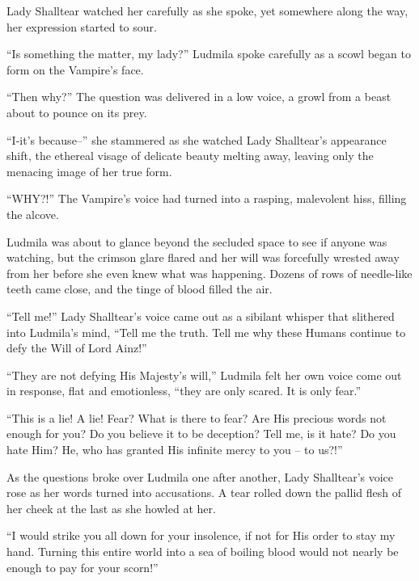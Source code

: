  

Lady Shalltear watched her carefully as she spoke, yet somewhere along the way, her expression started to sour.

 

“Is something the matter, my lady?” Ludmila spoke carefully as a scowl began to form on the Vampire’s face.

 

“Then why?” The question was delivered in a low voice, a growl from a beast about to pounce on its prey.

 

“I-it’s because–” she stammered as she watched Lady Shalltear’s appearance shift, the ethereal visage of delicate beauty melting away, leaving only the menacing image of her true form.

 

“WHY?!” The Vampire’s voice had turned into a rasping, malevolent hiss, filling the alcove.

 

Ludmila was about to glance beyond the secluded space to see if anyone was watching, but the crimson glare flared and her will was forcefully wrested away from her before she even knew what was happening. Dozens of rows of needle-like teeth came close, and the tinge of blood filled the air.

 

“Tell me!” Lady Shalltear’s voice came out as a sibilant whisper that slithered into Ludmila’s mind, “Tell me the truth. Tell me why these Humans continue to defy the Will of Lord Ainz!”

 

“They are not defying His Majesty’s will,” Ludmila felt her own voice come out in response, flat and emotionless, “they are only scared. It is only fear.”

 

“This is a lie! A lie! Fear? What is there to fear? Are His precious words not enough for you? Do you believe it to be deception? Tell me, is it hate? Do you hate Him? He, who has granted His infinite mercy to you – to us?!”

 

As the questions broke over Ludmila one after another, Lady Shalltear’s voice rose as her words turned into accusations. A tear rolled down the pallid flesh of her cheek at the last as she howled at her.

 

“I would strike you all down for your insolence, if not for His order to stay my hand. Turning this entire world into a sea of boiling blood would not nearly be enough to pay for your scorn!”

